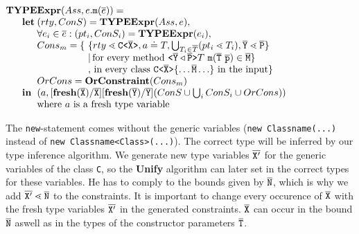 \documentclass[a4paper,USenglish,cleveref, autoref, thm-restate]{lipics-v2021}
\begin{document}
\smallskip

$\begin{array}{@{}l@{}l@{}l}
\textbf{TY}& \textbf{PE} & \textbf{Expr} (Ass, e.\mathtt{m}(\overline{e}) ) = \\
& \textbf{let} %
& (rty, ConS) = \textbf{TYPEExpr}(Ass, e),\\
& & \forall e_i \in \overline{e} : (pt_i, ConS_i) = \textbf{TYPEExpr}(e_i)  ,\\
& & \begin{array}{@{}l@{}l}
        Cons_{m} = \{\ & \set{ rty \lessdot \exptype{C}{\ol{X}}, a \doteq T, \bigcup_{T_i \in \overline{T}} (pt_i \lessdot T_i)
        , \ol{Y} \lessdot \ol{P} }\\
                    & |\, \text{for every method}\ \exptype{}{\ol{Y} \triangleleft \ol{P}} T\ \texttt{m}(\ol{T}\  \ol{p}) \in \ol{M} \} \\%
                    & ,\, \text{in every class}\ \exptype{C}{\ol{X}} \{ \ldots \ol{M} \ldots \}\ \text{in the input} \} 
                  \end{array}\\
& & OrCons = \textbf{OrConstraint}(Cons_{m})\\
& \mathbf{in}%
& (a, [\textbf{fresh}(\ol{X})/\ol{X}][\textbf{fresh}(\ol{Y})/\ol{Y}](ConS \cup \bigcup_i ConS_i \cup OrCons))\\
& & \text{where\ } a \text{\ is\ a\ fresh\
  type\ variable}\\ 
\end{array}
$

\smallskip

The \texttt{new}-statement comes without the generic variables
(\texttt{new Classname(...)} instead of \texttt{new Classname<Class>(...)}).
The correct type will be inferred by our type inference algorithm.
We generate new type variables $\overline{\tt X'}$ for the generic variables of the class \texttt{C},
so the \textbf{Unify} algorithm can later set in the correct types for these variables.
He has to comply to the bounds given by $\overline{\tt N}$, which is why we add $\overline{\tt X'} \lessdot \overline{\tt N}$ to the constraints.
It is important to change every occurence of $\overline{\tt X}$ with the fresh type variables $\overline{\tt X'}$ in the generated constraints.
$\overline{\tt X}$ can occur in the bound $\overline{\tt N}$ aswell as in the types of the constructor parameters $\overline{\tt T}$.
\end{document}
